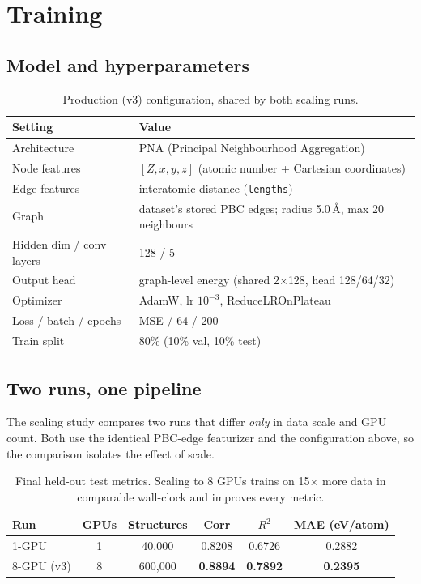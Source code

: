 \documentclass[11pt]{article}
\begin{document}
\section{Training}

\subsection{Model and hyperparameters}

\begin{table}[H]
\centering\small
\begin{tabular}{@{}ll@{}}
\toprule
\textbf{Setting} & \textbf{Value} \\
\midrule
Architecture & PNA (Principal Neighbourhood Aggregation)~\cite{pna} \\
Node features & $[Z, x, y, z]$ (atomic number + Cartesian coordinates) \\
Edge features & interatomic distance (\texttt{lengths}) \\
Graph & dataset's stored PBC edges; radius 5.0\,\AA{}, max 20 neighbours \\
Hidden dim / conv layers & 128 / 5 \\
Output head & graph-level energy (shared 2$\times$128, head 128/64/32) \\
Optimizer & AdamW, lr $10^{-3}$, ReduceLROnPlateau \\
Loss / batch / epochs & MSE / 64 / 200 \\
Train split & 80\% (10\% val, 10\% test) \\
\bottomrule
\end{tabular}
\caption{Production (v3) configuration, shared by both scaling runs.}
\end{table}

\subsection{Two runs, one pipeline}

The scaling study compares two runs that differ \emph{only} in data scale and GPU
count. Both use the identical PBC-edge featurizer and the configuration above, so
the comparison isolates the effect of scale.

\begin{table}[H]
\centering\small
\begin{tabular}{@{}lccccc@{}}
\toprule
\textbf{Run} & \textbf{GPUs} & \textbf{Structures} & \textbf{Corr} & \textbf{$R^2$} & \textbf{MAE (eV/atom)} \\
\midrule
1-GPU & 1 & 40{,}000  & 0.8208 & 0.6726 & 0.2882 \\
8-GPU (v3) & 8 & 600{,}000 & \textbf{0.8894} & \textbf{0.7892} & \textbf{0.2395} \\
\bottomrule
\end{tabular}
\caption{Final held-out test metrics. Scaling to 8 GPUs trains on 15$\times$ more
data in comparable wall-clock and improves every metric.}
\end{table}
\end{document}
